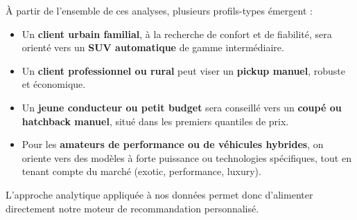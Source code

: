 \documentclass[12pt]{report}
\begin{document}
À partir de l’ensemble de ces analyses, plusieurs profils-types émergent :
\begin{itemize}
  \item Un \textbf{client urbain familial}, à la recherche de confort et de fiabilité, sera orienté vers un \textbf{SUV automatique} de gamme intermédiaire.
  \item Un \textbf{client professionnel ou rural} peut viser un \textbf{pickup manuel}, robuste et économique.
  \item Un \textbf{jeune conducteur ou petit budget} sera conseillé vers un \textbf{coupé ou hatchback manuel}, situé dans les premiers quantiles de prix.
  \item Pour les \textbf{amateurs de performance ou de véhicules hybrides}, on oriente vers des modèles à forte puissance ou technologies spécifiques, tout en tenant compte du marché (exotic, performance, luxury).
\end{itemize}

L’approche analytique appliquée à nos données permet donc d’alimenter directement notre moteur de recommandation personnalisé.
\end{document}
